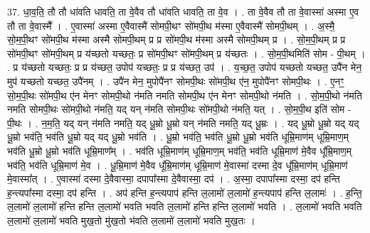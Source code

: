 \documentclass[17pt]{extarticle}
\begin{document}
37. धा॒व॒ति॒ तौ तौ धा॑वति धावति॒ ता वे॒वैव तौ धा॑वति धावति॒ ता वे॒व । . ता वे॒वैव तौ ता वे॒वास्मा॑ अस्मा ए॒व तौ ता वे॒वास्मै᳚ । . ए॒वास्मा॑ अस्मा ए॒वैवास्मै॑ सोमपी॒थꣳ सो॑मपी॒थ म॑स्मा ए॒वैवास्मै॑ सोमपी॒थम् । . अ॒स्मै॒ सो॒म॒पी॒थꣳ सो॑मपी॒थ म॑स्मा अस्मै सोमपी॒थम् प्र प्र सो॑मपी॒थ म॑स्मा अस्मै सोमपी॒थम् प्र । . सो॒म॒पी॒थम् प्र प्र सो॑मपी॒थꣳ सो॑मपी॒थम् प्र य॑च्छतो यच्छतः॒ प्र सो॑मपी॒थꣳ सो॑मपी॒थम् प्र य॑च्छतः । . सो॒म॒पी॒थमिति॑ सोम - पी॒थम् । . प्र य॑च्छतो यच्छतः॒ प्र प्र य॑च्छत॒ उपोप॑ यच्छतः॒ प्र प्र य॑च्छत॒ उप॑ । . य॒च्छ॒त॒ उपोप॑ यच्छतो यच्छत॒ उपै॑न मेन॒ मुप॑ यच्छतो यच्छत॒ उपै॑नम् । . उपै॑न मेन॒ मुपोपै॑नꣳ सोमपी॒थः सो॑मपी॒थ ए॑न॒ मुपोपै॑नꣳ सोमपी॒थः । . ए॒नꣳ॒॒ सो॒म॒पी॒थः सो॑मपी॒थ ए॑न मेनꣳ सोमपी॒थो न॑मति नमति सोमपी॒थ ए॑न मेनꣳ सोमपी॒थो न॑मति । . सो॒म॒पी॒थो न॑मति नमति सोमपी॒थः सो॑मपी॒थो न॑मति॒ यद् यन् न॑मति सोमपी॒थः सो॑मपी॒थो न॑मति॒ यत् । . सो॒म॒पी॒थ इति॑ सोम - पी॒थः । . न॒म॒ति॒ यद् यन् न॑मति नमति॒ यद् धू॒म्रो धू॒म्रो यन् न॑मति नमति॒ यद् धू॒म्रः । . यद् धू॒म्रो धू॒म्रो यद् यद् धू॒म्रो भव॑ति॒ भव॑ति धू॒म्रो यद् यद् धू॒म्रो भव॑ति । . धू॒म्रो भव॑ति॒ भव॑ति धू॒म्रो धू॒म्रो भव॑ति धूम्रि॒माण॑म् धूम्रि॒माण॒म् भव॑ति धू॒म्रो धू॒म्रो भव॑ति धूम्रि॒माण᳚म् । . भव॑ति धूम्रि॒माण॑म् धूम्रि॒माण॒म् भव॑ति॒ भव॑ति धूम्रि॒माण॑ मे॒वैव धू᳚म्रि॒माण॒म् भव॑ति॒ भव॑ति धूम्रि॒माण॑ मे॒व । . धू॒म्रि॒माण॑ मे॒वैव धू᳚म्रि॒माण॑म् धूम्रि॒माण॑ मे॒वास्मा॑ दस्मा दे॒व धू᳚म्रि॒माण॑म् धूम्रि॒माण॑ मे॒वास्मा᳚त् । . ए॒वास्मा॑ दस्मा दे॒वैवास्मा॒ दपापा᳚स्मा दे॒वैवास्मा॒ दप॑ । . अ॒स्मा॒ दपापा᳚स्मा दस्मा॒ दप॑ हन्ति ह॒न्त्यपा᳚स्मा दस्मा॒ दप॑ हन्ति । . अप॑ हन्ति ह॒न्त्यपाप॑ हन्ति ल॒लामो॑ ल॒लामो॑ ह॒न्त्यपाप॑ हन्ति ल॒लामः॑ । . ह॒न्ति॒ ल॒लामो॑ ल॒लामो॑ हन्ति हन्ति ल॒लामो॑ भवति भवति ल॒लामो॑ हन्ति हन्ति ल॒लामो॑ भवति । . ल॒लामो॑ भवति भवति ल॒लामो॑ ल॒लामो॑ भवति मुख॒तो मु॑ख॒तो भ॑वति ल॒लामो॑ ल॒लामो॑ भवति मुख॒तः । \newline
\pagebreak
{}
\end{document}
